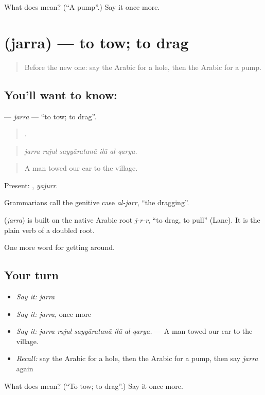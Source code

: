 \begin{tcolorbox}[breakable,colback=teal!4,colframe=teal!35!black,title={Before you move on}]
What does  mean? (\textquotedblleft{}A pump\textquotedblright{}.) Say it once more.
\end{tcolorbox}
\section[\texorpdfstring{\ar{جر} (jarra)}{جر (jarra)}]{ (jarra) — to tow; to drag}

\label{lesson:AR-C433-jarra}



\begin{quote}
Before the new one: say the Arabic for a hole, then the Arabic for a pump.
\end{quote}

\subsection*{You'll want to know: }
\textbf{} — \emph{jarra} — \textquotedblleft{}to tow; to drag\textquotedblright{}.

\begin{quote}
    .
\end{quote}

\begin{quote}
\emph{jarra rajul sayyāratanā ilā al-qarya.}
\end{quote}

\begin{quote}
A man towed our car to the village.
\end{quote}

Present: , \emph{yajurr}.

Grammarians call the genitive case \emph{al-jarr}, \textquotedblleft{}the dragging\textquotedblright{}.

\begin{cousinweb}
\textbf{} (\emph{jarra}) is built on the native Arabic root \emph{j-r-r}, \textquotedblleft{}to drag, to pull\textquotedblright{} (Lane). It is the plain verb of a doubled root.
\end{cousinweb}

\begin{grammarlens}[title={What you've built}]
One more word for getting around.
\end{grammarlens}

\subsection*{Your turn}
\begin{itemize}
\raggedright
  \item \emph{Say it:} \emph{jarra}
  \item \emph{Say it:} \emph{jarra}, once more
  \item \emph{Say it:} \emph{jarra rajul sayyāratanā ilā al-qarya.} — A man towed our car to the village.
  \item \emph{Recall:} say the Arabic for a hole, then the Arabic for a pump, then say \emph{jarra} again
\end{itemize}

\begin{tcolorbox}[breakable,colback=teal!4,colframe=teal!35!black,title={Before you move on}]
What does  mean? (\textquotedblleft{}To tow; to drag\textquotedblright{}.) Say it once more.
\end{tcolorbox}
